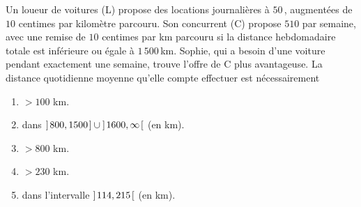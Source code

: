 %
%
Un loueur de voitures (L) propose des locations journalières à $50$\,\currency, augmentées de $10$ centimes par kilomètre %
parcouru. Son concurrent (C) propose $510$\,\currency\,par semaine, avec une remise de $10$ centimes par km parcouru si la %
distance hebdomadaire totale est inférieure ou égale à $1\,500$\,km. Sophie, qui a besoin d'une voiture pendant exactement %
une semaine, trouve l'offre de C plus avantageuse. La distance quotidienne moyenne qu'elle compte effectuer est nécessairement
%
\begin{enumerate}
  \item $> 100$ km.
  \item dans $\openClosedInterval*{800}{1500}\cup\openInterval*{1600}{\infty}$ (en km).
  \item $> 800$ km.
  \item $> 230$ km.
  \item dans l'intervalle $\openInterval*{114}{215}$ (en km).
\end{enumerate}
%

